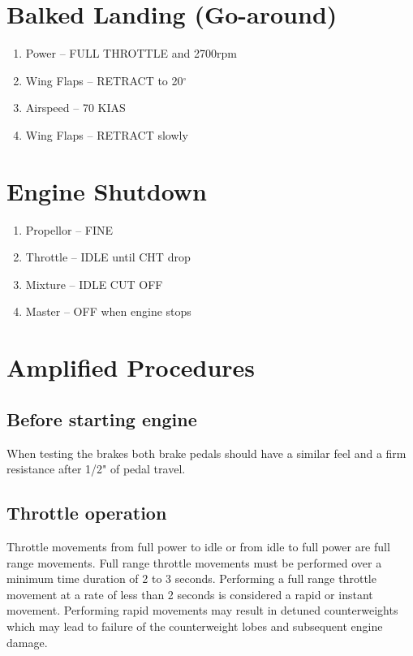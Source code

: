 \section{Balked Landing (Go-around)}
\begin{enumerate}[(1)]
\item Power -- FULL THROTTLE and 2700rpm
\item Wing Flaps -- RETRACT to 20$^{\circ}$
\item Airspeed --  70 KIAS
\item Wing Flaps -- RETRACT slowly
\end{enumerate}

\section{Engine Shutdown}
\begin{enumerate}[(1)]
\item Propellor -- FINE 
\item Throttle  -- IDLE until CHT drop
\item Mixture  --  IDLE CUT OFF
\item Master -- OFF when engine stops
\end{enumerate}

\section{Amplified Procedures}

\subsection{Before starting engine}
When testing the brakes both brake pedals should have a similar feel and a firm resistance after 1/2" of pedal travel.

\subsection{Throttle operation}
Throttle movements from full power to idle or from idle to full power are full range movements. Full range throttle movements must be performed over a minimum time duration of 2 to 3 seconds. Performing a full range throttle movement at a rate of less than 2 seconds is considered a rapid or
instant movement. Performing rapid movements may result in detuned counterweights which may lead to failure of the counterweight lobes and subsequent engine damage.


